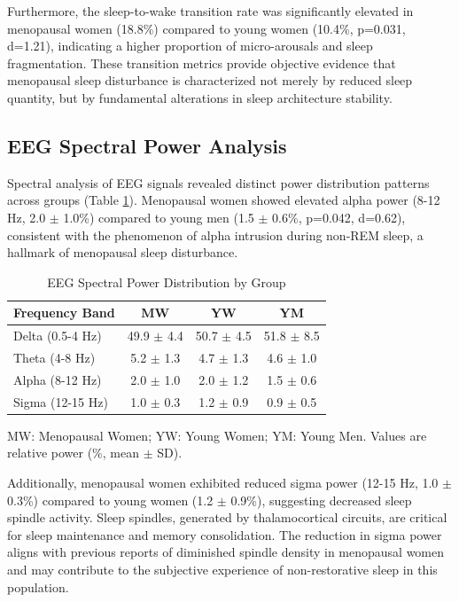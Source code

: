 \documentclass[a4paper,fleqn]{cas-dc}
\begin{document}
Furthermore, the sleep-to-wake transition rate was significantly elevated in menopausal women (18.8\%) compared to young women (10.4\%, p=0.031, d=1.21), indicating a higher proportion of micro-arousals and sleep fragmentation. These transition metrics provide objective evidence that menopausal sleep disturbance is characterized not merely by reduced sleep quantity, but by fundamental alterations in sleep architecture stability.

\subsection{EEG Spectral Power Analysis}

Spectral analysis of EEG signals revealed distinct power distribution patterns across groups (Table \ref{tab:spectrum}). Menopausal women showed elevated alpha power (8-12 Hz, 2.0 $\pm$ 1.0\%) compared to young men (1.5 $\pm$ 0.6\%, p=0.042, d=0.62), consistent with the phenomenon of alpha intrusion during non-REM sleep, a hallmark of menopausal sleep disturbance.

\begin{table}[!ht]
\centering
\caption{EEG Spectral Power Distribution by Group}
\label{tab:spectrum}
\begin{threeparttable}
\begin{tabular}{lccc}
\toprule
\textbf{Frequency Band} & \textbf{MW} & \textbf{YW} & \textbf{YM} \\
\midrule
Delta (0.5-4 Hz) & 49.9 $\pm$ 4.4 & 50.7 $\pm$ 4.5 & 51.8 $\pm$ 8.5 \\
Theta (4-8 Hz) & 5.2 $\pm$ 1.3 & 4.7 $\pm$ 1.3 & 4.6 $\pm$ 1.0 \\
Alpha (8-12 Hz) & 2.0 $\pm$ 1.0 & 2.0 $\pm$ 1.2 & 1.5 $\pm$ 0.6 \\
Sigma (12-15 Hz) & 1.0 $\pm$ 0.3 & 1.2 $\pm$ 0.9 & 0.9 $\pm$ 0.5 \\
\bottomrule
\end{tabular}
\begin{tablenotes}
\small
\item MW: Menopausal Women; YW: Young Women; YM: Young Men. Values are relative power (\%, mean $\pm$ SD).
\end{tablenotes}
\end{threeparttable}
\end{table}

Additionally, menopausal women exhibited reduced sigma power (12-15 Hz, 1.0 $\pm$ 0.3\%) compared to young women (1.2 $\pm$ 0.9\%), suggesting decreased sleep spindle activity. Sleep spindles, generated by thalamocortical circuits, are critical for sleep maintenance and memory consolidation. The reduction in sigma power aligns with previous reports of diminished spindle density in menopausal women and may contribute to the subjective experience of non-restorative sleep in this population.
\end{document}
